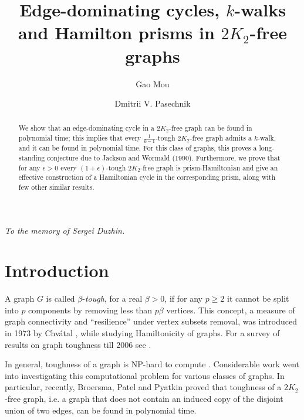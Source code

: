 \documentclass[runningheads,a4paper]{llncs}
\begin{document}
\mainmatter

\title{Edge-dominating cycles, $k$-walks and Hamilton prisms in $2K_2$-free graphs}

\author{Gao Mou \and Dmitrii V. Pasechnik}




\maketitle

\begin{flushright}
    \textit{To the memory of Sergei Duzhin.}
\end{flushright}

\begin{abstract}
We show that an edge-dominating cycle in a $2K_2$-free graph can be found
in polynomial time; this implies that every $\frac{1}{k-1}$-tough
$2K_2$-free graph admits a $k$-walk, and it can be found in polynomial time.
For this class of graphs, this proves a
long-standing conjecture due to Jackson and Wormald (1990).
Furthermore, we prove that for any $\epsilon>0$ every $(1+\epsilon)$-tough $2K_2$-free graph is prism-Hamiltonian
and give an effective construction of a Hamiltonian cycle in the corresponding prism,
along with few other similar results.
\end{abstract}


\section{Introduction}
A graph $G$ is called $\beta$-{\em tough}, for a real $\beta>0$, if for any $p\geq 2$ it
cannot be split into $p$ components by removing less than $p\beta$ vertices.
This concept, a measure of graph connectivity and ``resilience'' under vertex subsets removal,
was introduced in 1973 by Chv\'{a}tal \cite{chvatal1973tough},
while studying   Hamiltonicity of graphs. For a survey of results on graph toughness till 2006
see \cite{MR2221006}.

In general, toughness of a graph is NP-hard to compute
\cite{MR1074858}. Considerable work went into investigating this computational problem for
various classes of graphs. In particular, recently, Broersma, Patel and Pyatkin proved
\cite{broersma2014toughness} that toughness of a $2K_2$-free graph, i.e. a graph that
does not contain an induced copy of the disjoint union of two edges,
can be found in polynomial time.
\end{document}
